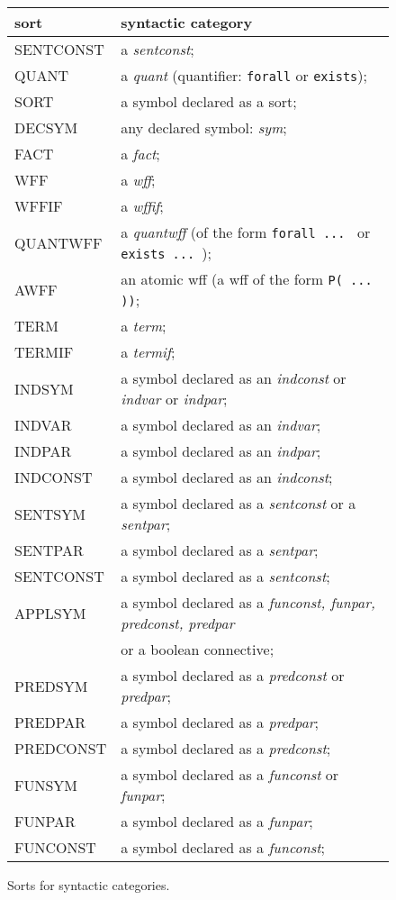 {  \begin{figure}
    \begin{tabular}{|l|l|}
   \hline
   {\bf sort}&  {\bf syntactic category} \hspace{7cm} \\ \hline \hline
   SENTCONST &  a {\em sentconst}; \\
   QUANT     &  a {\em quant} (quantifier: {\tt forall} or {\tt exists}); \\
   SORT      &  a symbol declared as a sort; \\
   DECSYM    &  any declared symbol: {\em sym};\\
   FACT      &  a {\em fact};\\
   WFF       &  a {\em wff}; \\
   WFFIF     &  a {\em wffif};\\
   QUANTWFF  &  a {\em quantwff} (of the form  {\tt forall ... }  or 
                {\tt exists  ... });\\
   AWFF      &  an atomic wff (a wff of the form {\tt P( ... ))};\\
   TERM      &  a {\em term}; \\
   TERMIF    &  a {\em termif};\\
   INDSYM    &  a symbol declared as an {\em indconst} or {\em indvar} or
                {\em indpar}; \\
   INDVAR    &  a symbol declared as an {\em indvar};\\
   INDPAR    &  a symbol declared as an {\em indpar};\\
   INDCONST  &  a symbol declared as an {\em indconst};\\
   SENTSYM   &  a symbol declared as a {\em sentconst} or a {\em sentpar}; \\
   SENTPAR   &  a symbol declared as a {\em sentpar}; \\
   SENTCONST &  a symbol declared as a {\em sentconst}; \\
   APPLSYM   &  a symbol declared as a {\em funconst, funpar, predconst, 
                predpar} \\
             &  or a boolean connective; \\ 
   PREDSYM   &  a symbol declared as a {\em predconst} or {\em predpar}; \\
   PREDPAR   &  a symbol declared as a {\em predpar}; \\
   PREDCONST &  a symbol declared as a {\em predconst}; \\
   FUNSYM    &  a symbol declared as a {\em funconst} or {\em funpar}; \\
   FUNPAR    &  a symbol declared as a {\em funpar}; \\
   FUNCONST  &  a symbol declared as a {\em funconst}; \\ \hline 
   \end{tabular}
   \caption{
	Sorts for {\GF} syntactic categories.
   }
   \end{figure}

}
